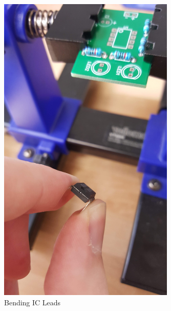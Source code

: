 \documentclass{article}
\begin{document}
\begin{enumerate}
\begin{figure}[H]
\caption{ Bending IC Leads }
\label{fig:img/0024.jpg}
\centering
\includegraphics[width=0.75\textwidth]{img/0024.jpg}
\end{figure}


\end{enumerate}
\end{document}
